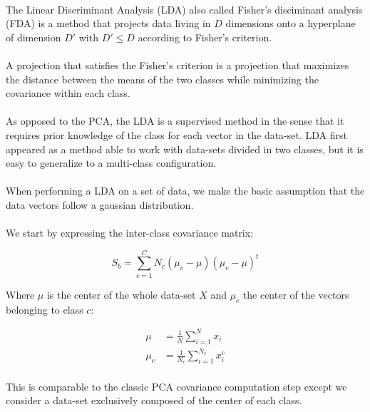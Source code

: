 
\paragraph{}
The Linear Discriminant Analysis (LDA) also called Fisher's disciminant analysis (FDA) is a method that projects data living in $D$ dimensions onto a hyperplane of dimension $D'$ with $D' \leq D$ according to Fisher's criterion. 

\paragraph{}
A projection that satisfies the Fisher's criterion is a projection that maximizes the distance between the means of the two classes while minimizing the covariance within each class.

\paragraph{}
As opposed to the PCA, the LDA is a supervised method in the sense that it requires prior knowledge of the class for each vector in the data-set. LDA first appeared as a method able to work with data-sets
divided in two classes, but it is easy to generalize to a multi-class configuration.

\paragraph{}
When performing a LDA on a set of data, we make the basic assumption that the data vectors follow a gaussian distribution.

\paragraph{}
We start by expressing the inter-class covariance matrix:

\begin{equation*}
S_b = \sum_{c = 1}^C N_c(\mu_c - \mu)(\mu_c - \mu)^t
\end{equation*}

Where $\mu$ is the center of the whole data-set $X$ and $\mu_c$ the center of the vectors belonging to class $c$:

\begin{align*}
\mu &= \frac{1}{N}\sum_{i = 1}^{N} x_i \\
\mu_c &= \frac{1}{N_c}\sum_{i = 1}^{N_c} x_i^c
\end{align*}

\paragraph{}
This is comparable to the classic PCA covariance computation step except we consider a data-set
exclusively composed of the center of each class.

